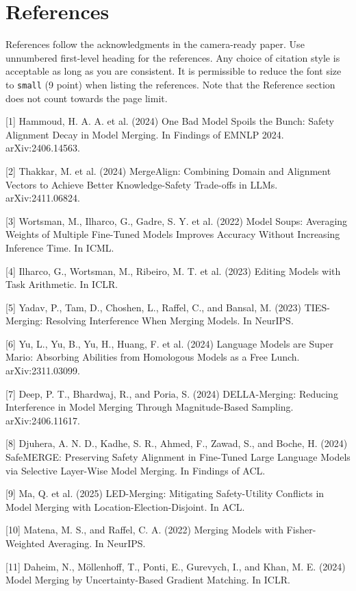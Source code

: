 \documentclass{article}
\begin{document}
\section*{References}


References follow the acknowledgments in the camera-ready paper. Use unnumbered first-level heading for
the references. Any choice of citation style is acceptable as long as you are
consistent. It is permissible to reduce the font size to \verb+small+ (9 point)
when listing the references.
Note that the Reference section does not count towards the page limit.
\medskip


{
\small
[1] Hammoud, H. A. A. et al. (2024) One Bad Model Spoils the Bunch: Safety Alignment Decay in Model Merging. In Findings of EMNLP 2024. arXiv:2406.14563.

[2] Thakkar, M. et al. (2024) MergeAlign: Combining Domain and Alignment Vectors to Achieve Better Knowledge-Safety Trade-offs in LLMs. arXiv:2411.06824.

[3] Wortsman, M., Ilharco, G., Gadre, S. Y. et al. (2022) Model Soups: Averaging Weights of Multiple Fine-Tuned Models Improves Accuracy Without Increasing Inference Time. In ICML.

[4] Ilharco, G., Wortsman, M., Ribeiro, M. T. et al. (2023) Editing Models with Task Arithmetic. In ICLR.

[5] Yadav, P., Tam, D., Choshen, L., Raffel, C., and Bansal, M. (2023) TIES-Merging: Resolving Interference When Merging Models. In NeurIPS.

[6] Yu, L., Yu, B., Yu, H., Huang, F. et al. (2024) Language Models are Super Mario: Absorbing Abilities from Homologous Models as a Free Lunch. arXiv:2311.03099.

[7] Deep, P. T., Bhardwaj, R., and Poria, S. (2024) DELLA-Merging: Reducing Interference in Model Merging Through Magnitude-Based Sampling. arXiv:2406.11617.

[8] Djuhera, A. N. D., Kadhe, S. R., Ahmed, F., Zawad, S., and Boche, H. (2024) SafeMERGE: Preserving Safety Alignment in Fine-Tuned Large Language Models via Selective Layer-Wise Model Merging. In Findings of ACL.

[9] Ma, Q. et al. (2025) LED-Merging: Mitigating Safety-Utility Conflicts in Model Merging with Location-Election-Disjoint. In ACL.

[10] Matena, M. S., and Raffel, C. A. (2022) Merging Models with Fisher-Weighted Averaging. In NeurIPS.

[11] Daheim, N., Möllenhoff, T., Ponti, E., Gurevych, I., and Khan, M. E. (2024) Model Merging by Uncertainty-Based Gradient Matching. In ICLR.

}
\end{document}

